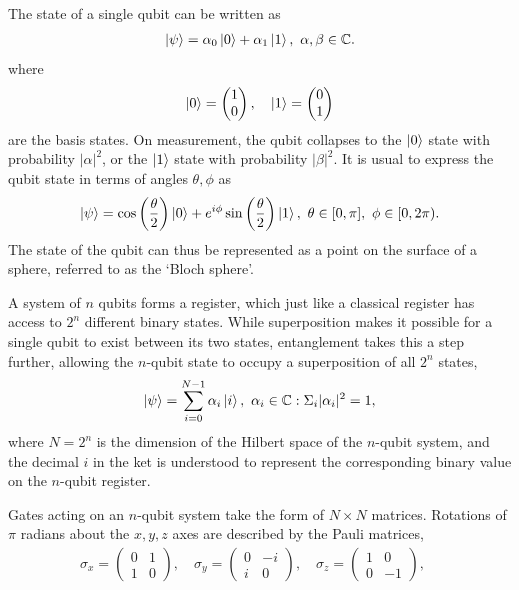 \documentclass[../Thesis.tex]{subfiles}
\begin{document}
The state of a single qubit can be written as
\begin{align}
    \ket{\psi} = \alpha_0\ket{0}+\alpha_1\ket{1},\ \alpha,\beta\in\mathbb{C}.
\end{align}
where 
\begin{align}
    \ket{0} = \begin{pmatrix}1 \\ 0\end{pmatrix},\quad \ket{1} = \begin{pmatrix}0 \\ 1\end{pmatrix}
\end{align}
are the basis states. 
On measurement, the qubit collapses to the $\ket{0}$ state with probability $|\alpha|^2$, or the $\ket{1}$ state with probability $|\beta|^2$. It is usual to express the qubit state in terms of angles $\theta,\phi$ as
\begin{align}
    \ket{\psi} = \cos\left(\frac{\theta}{2}\right)\ket{0} + e^{i\phi}\sin\left(\frac{\theta}{2}\right)\ket{1},\ \theta\in [0,\pi],\ \phi\in [0,2\pi).
\end{align}
The state of the qubit can thus be represented as a point on the surface of a sphere, referred to as the `Bloch sphere'. 

A system of $n$ qubits forms a register, which just like a classical register has access to $2^n$ different binary states. While superposition makes it possible for a single qubit to exist between its two states, entanglement takes this a step further, allowing the $n$-qubit state to occupy a superposition of all $2^n$ states,
\begin{align}
    \ket{\psi} = \sum_{i=0}^{N-1} \alpha_i\ket{i},\ \alpha_i\in\mathbb{C}: \Sigma_i|\alpha_i|^2=1,
\end{align}
where $N=2^n$ is the dimension of the Hilbert space of the $n$-qubit system, and the decimal $i$ in the ket is understood to represent the corresponding binary value on the $n$-qubit register.

Gates acting on an $n$-qubit system take the form of $N\times N$ matrices. Rotations of $\pi$ radians about the $x,y,z$ axes are described by the Pauli matrices,
\begin{align}
    \sigma_x = \begin{pmatrix} 0 &1\\ 1 &0\end{pmatrix},\quad 
    \sigma_y = \begin{pmatrix} 0 &-i\\ i &0\end{pmatrix},\quad
    \sigma_z = \begin{pmatrix} 1 &0\\ 0 &-1\end{pmatrix},\quad
\end{align}
\end{document}
